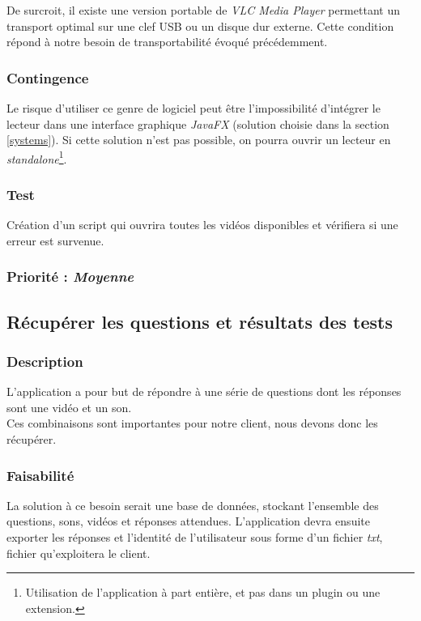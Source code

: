 De surcroit, il existe une version portable de \textit{VLC Media Player} permettant un transport optimal sur une clef USB ou un disque dur externe. Cette condition répond à notre besoin de transportabilité évoqué précédemment.

\subsubsection{Contingence}

Le risque d’utiliser ce genre de logiciel peut être l'impossibilité d'intégrer le lecteur dans une interface graphique \textit{JavaFX} (solution choisie dans la section \ref{systems}). Si cette solution n’est pas possible, on pourra ouvrir un lecteur en \textit{standalone}\footnote{Utilisation de l'application à part entière, et pas dans un plugin ou une extension.}.

\subsubsection{Test}

Création d’un script qui ouvrira toutes les vidéos disponibles et vérifiera si une erreur est survenue.

\subsubsection{Priorité : \textit{Moyenne}}

\subsection{Récupérer les questions et résultats des tests}

\subsubsection{Description}

L’application a pour but de répondre à une série de questions dont les réponses sont une vidéo et un son.\\
Ces combinaisons sont importantes pour notre client, nous devons donc les récupérer.

\subsubsection{Faisabilité}

La solution à ce besoin serait une base de données, stockant l’ensemble des questions, sons, vidéos et réponses attendues.
L’application devra ensuite exporter les réponses et l'identité de l'utilisateur sous forme d’un fichier \textit{txt}, fichier qu’exploitera le client.   

